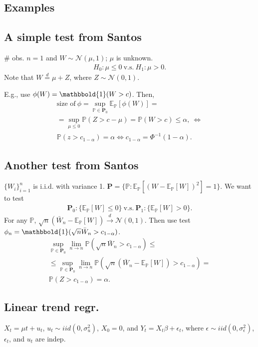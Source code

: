 \documentclass[9pt]{extarticle}
\newcommand{\PP}{\mathbb{P}}
\newcommand{\EE}{\mathbb{E}}
\newcommand{\bi}{\mathbbold{1}}
\newcommand{\darrow}{\overset{d}{\rightarrow}}
\begin{document}
\begin{multicols*}{4}
\section*{Examples}
\subsection*{A simple test from Santos}
\# obs. $n=1$ and $W\sim \mathcal{N}(\mu, 1)$; $\mu$ is unknown.
\begin{gather*}
    H_0: \mu \leq 0 ~\text{v.s.}~H_1: \mu > 0.
\end{gather*}
Note that $W \overset{d}{=} \mu + Z$, where $Z \sim \mathcal{N}(0,1)$.

E.g., use $\phi(W) = \bi(W > c)$. Then,
\begin{gather*}
    \text{size of}~\phi = \sup_{\PP \in \mathbf{P}_0} \EE_{\PP}[\phi(W)] = \\
    = \sup_{\mu \leq 0} \PP(Z > c - \mu) = \PP(W > c) \leq \alpha, ~ \Leftrightarrow \\
    \PP(z > c_{1-\alpha}) = \alpha \Leftrightarrow c_{1-\alpha} = \Phi^{-1}(1-\alpha).
\end{gather*}

\subsection*{Another test from Santos}
$\{W_i\}_{i=1}^n$ is i.i.d. with variance 1. $\mathbf{P} = \{\PP: \EE_{\PP}[(W - \EE_\PP[W])^2] = 1\}$. We want to test
\begin{gather*}
    \mathbf{P}_0: \{\EE_\PP[W] \leq 0\}~\text{v.s.}~\mathbf{P}_1: \{\EE_\PP[W] > 0\}.
\end{gather*}
For any $\PP$, $\sqrt{n}(\bar{W}_n - \EE_\PP[W]) \darrow \mathcal{N}(0,1)$. Then use test $\phi_n = \bi(\sqrt{n}\bar{W}_n > c_{1-\alpha})$.
\begin{gather*}
    \sup_{\PP \in \mathbf{P}_0} \lim_{n \rightarrow n} \PP(\sqrt{n}\bar{W}_n > c_{1-\alpha}) \leq \\
    \leq \sup_{\PP \in \mathbf{P}_0} \lim_{n \rightarrow n} \PP(\sqrt{n} (\bar{W}_n - \EE_\PP[W]) > c_{1-\alpha}) = \\
    \PP(Z > c_{1-\alpha}) = \alpha.
\end{gather*}


\subsection*{Linear trend regr.}
$X_t = \mu t + u_t$, $u_t \sim iid(0,\sigma_u^2)$, $X_0 = 0$, and $Y_t = X_t \beta + \epsilon_t$, where $\epsilon \sim iid(0, \sigma_\epsilon^2)$, $\epsilon_t$, and $u_t$ are indep. 


\end{multicols*}
\end{document}
